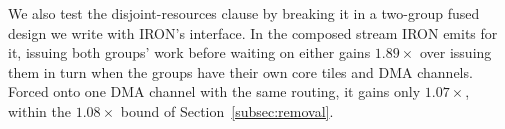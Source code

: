 We also test the disjoint-resources clause by breaking it in a two-group fused design we write with IRON's interface.
In the composed stream IRON emits for it, issuing both groups' work before waiting on either gains $1.89\times$ over issuing them in turn when the groups have their own core tiles and DMA channels.
Forced onto one DMA channel with the same routing, it gains only $1.07\times$, within the $1.08\times$ bound of Section~\ref{subsec:removal}.
